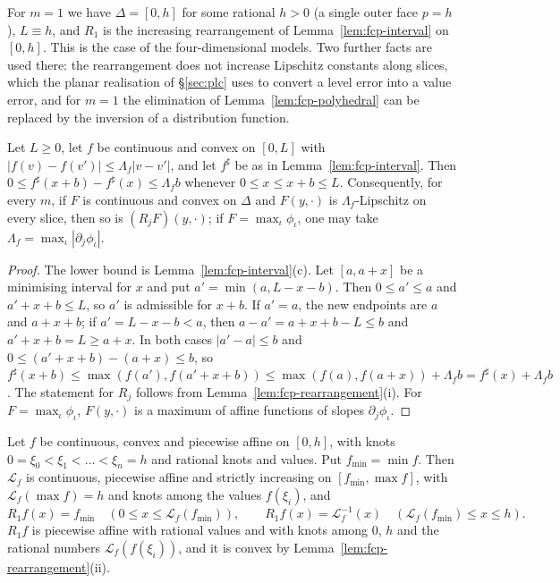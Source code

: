 For $m=1$ we have $\Delta=[0,h]$ for some rational $h>0$ (a single outer face $p=h$), $L\equiv h$, and $R_1$ is the
increasing rearrangement of Lemma~\ref{lem:fcp-interval} on $[0,h]$. This is the case of the four-dimensional
models. Two further facts are used there: the rearrangement does not increase Lipschitz constants along slices, which
the planar realisation of \S\ref{sec:plc} uses to convert a level error into a value error, and for $m=1$ the
elimination of Lemma~\ref{lem:fcp-polyhedral} can be replaced by the inversion of a distribution function.

\begin{lemma}\label{lem:fcp-lipschitz}
Let $L\ge0$, let $f$ be continuous and convex on $[0,L]$ with $|f(v)-f(v')|\le\Lambda_f|v-v'|$, and let $f^\sharp$ be
as in Lemma~\ref{lem:fcp-interval}. Then $0\le f^\sharp(x+b)-f^\sharp(x)\le\Lambda_fb$ whenever $0\le x\le x+b\le L$.
Consequently, for every $m$, if $F$ is continuous and convex on $\Delta$ and $F(y,\cdot)$ is $\Lambda_f$-Lipschitz on
every slice, then so is $(R_jF)(y,\cdot)$; if $F=\max_\iota\phi_\iota$, one may take
$\Lambda_f=\max_\iota|\partial_j\phi_\iota|$.
\end{lemma}

\begin{proof}
The lower bound is Lemma~\ref{lem:fcp-interval}(c). Let $[a,a+x]$ be a minimising interval for $x$ and put
$a'=\min(a,L-x-b)$. Then $0\le a'\le a$ and $a'+x+b\le L$, so $a'$ is admissible for $x+b$. If $a'=a$, the new
endpoints are $a$ and $a+x+b$; if $a'=L-x-b<a$, then $a-a'=a+x+b-L\le b$ and $a'+x+b=L\ge a+x$. In both cases
$|a'-a|\le b$ and $0\le(a'+x+b)-(a+x)\le b$, so
$f^\sharp(x+b)\le\max(f(a'),f(a'+x+b))\le\max(f(a),f(a+x))+\Lambda_fb=f^\sharp(x)+\Lambda_fb$. The statement for $R_j$
follows from Lemma~\ref{lem:fcp-rearrangement}(i). For $F=\max_\iota\phi_\iota$, $F(y,\cdot)$ is a maximum of affine
functions of slopes $\partial_j\phi_\iota$.
\end{proof}

\begin{lemma}\label{lem:fcp-distribution}
Let $f$ be continuous, convex and piecewise affine on $[0,h]$, with knots $0=\xi_0<\xi_1<\dots<\xi_n=h$ and rational
knots and values. Put $f_{\min}=\min f$. Then $\mathcal L_f$ is continuous, piecewise affine and strictly increasing on
$[f_{\min},\max f]$, with $\mathcal L_f(\max f)=h$ and knots among the values $f(\xi_i)$, and
\[
 R_1f(x)=f_{\min}\quad(0\le x\le\mathcal L_f(f_{\min})),\qquad R_1f(x)=\mathcal L_f^{-1}(x)\quad(\mathcal L_f(f_{\min})\le x\le h).
\]
$R_1f$ is piecewise affine with rational values and with knots among $0$, $h$ and the rational numbers
$\mathcal L_f(f(\xi_i))$, and it is convex by Lemma~\ref{lem:fcp-rearrangement}(ii).
\end{lemma}


